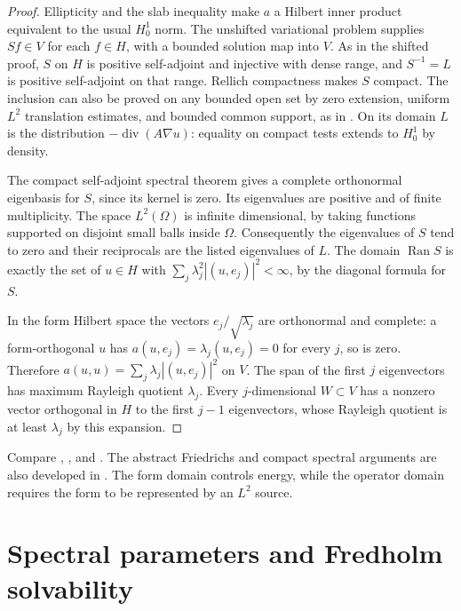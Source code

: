 \documentclass[11pt,oneside,openany]{book}
\theoremstyle{plain}
\theoremstyle{definition}
\theoremstyle{remark}
\begin{document}
\begin{proof}
Ellipticity and the slab inequality make \(a\) a Hilbert
inner product equivalent to the usual \(H_0^1\) norm.
The unshifted variational problem supplies \(Sf\in V\) for
each \(f\in H\), with a bounded solution map into \(V\).
As in the shifted proof, \(S\) on \(H\) is positive
self-adjoint and injective with dense range, and
\(S^{-1}=L\) is positive self-adjoint on that range.
Rellich compactness makes \(S\) compact. The inclusion
can also be proved on any bounded open set by zero
extension, uniform \(L^2\) translation estimates, and
bounded common support, as in \cite[V08.01]{P106}.
On its domain \(L\) is the distribution
\(-\operatorname{div}(A\nabla u)\): equality on compact
tests extends to \(H_0^1\) by density.

The compact self-adjoint spectral theorem gives a complete
orthonormal eigenbasis for \(S\), since its kernel is zero.
Its eigenvalues are positive and of finite multiplicity.
The space \(L^2(\Omega)\) is infinite dimensional, by taking
functions supported on disjoint small balls inside \(\Omega\).
Consequently the eigenvalues of \(S\) tend to zero and their
reciprocals are the listed eigenvalues of \(L\).
The domain \(\operatorname{Ran}S\) is exactly the set of
\(u\in H\) with \(\sum_j\lambda_j^2|(u,e_j)|^2<\infty\),
by the diagonal formula for \(S\).

In the form Hilbert space the vectors \(e_j/\sqrt{\lambda_j}\)
are orthonormal and complete: a form-orthogonal \(u\) has
\(a(u,e_j)=\lambda_j(u,e_j)=0\) for every \(j\), so is zero.
Therefore \(a(u,u)=\sum_j\lambda_j|(u,e_j)|^2\) on \(V\).
The span of the first \(j\) eigenvectors has maximum
Rayleigh quotient \(\lambda_j\). Every \(j\)-dimensional
\(W\subset V\) has a nonzero vector orthogonal in \(H\) to
the first \(j-1\) eigenvectors, whose Rayleigh quotient
is at least \(\lambda_j\) by this expansion.
\end{proof}

Compare \cite[Section 6.5.1]{Evans},
\cite[Section 9.3.2]{RR}, and \cite[Chapter 8]{TaylorII}.
The abstract Friedrichs and compact spectral arguments
are also developed in \cite{D16}. The form domain controls
energy, while the operator domain requires the form to
be represented by an \(L^2\) source.

\section{Spectral parameters and Fredholm solvability}\label{pde:E11}
\end{document}
